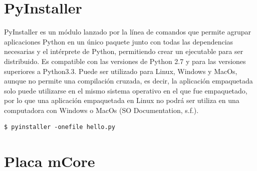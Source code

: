 \documentclass{report}
\begin{document}
\section{PyInstaller}

PyInstaller es un módulo lanzado por la línea de comandos que permite agrupar aplicaciones Python en un único paquete junto con todas las dependencias necesarias y el intérprete de Python, permitiendo crear un ejecutable para ser distribuido. Es compatible con las versiones de Python 2.7 y para las versiones superiores a Python3.3. Puede ser utilizado para Linux, Windows y MacOs, aunque no permite una compilación cruzada, es decir, la aplicación empaquetada solo puede utilizarse en el mismo sistema operativo en el que fue empaquetado, por lo que una aplicación empaquetada en Linux no podrá ser utiliza en una computadora con Windows o MacOs (SO Documentation, s.f.).
\\
\begin{lstlisting}[frame=single,breaklines=true, label=Ejemplo para generar un ejecutable con PyInstaller, caption=Ejemplo para generar un ejecutable con PyInstaller, captionpos=b]
 		   $ pyinstaller -onefile hello.py
\end{lstlisting}

\section{Placa mCore}
\end{document}
